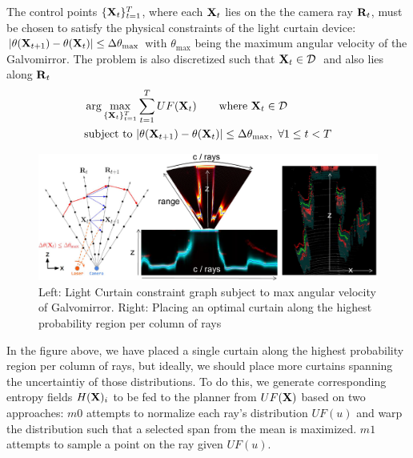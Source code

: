 The control points $\{\mathbf{X}_t\}_{t=1}^T$, where each $\mathbf{X}_t$ lies on the the camera ray $\mathbf{R}_t$, must be chosen to satisfy the physical constraints of the light curtain device: $|\theta(\mathbf{X}_{t+1}) - \theta(\mathbf{X}_t)| \leq \Delta \theta_\text{max}$ with $\theta_\text{max}$ being the maximum angular velocity of the Galvomirror. The problem is also discretized such that $\X_{t} \in \D\ $ and also lies along $\mathbf{R}_t$
\begin{align}
    &\arg \max_{\{\mathbf{X}_t\}_{t=1}^T} \sum_{t=1}^T UF(\mathbf{X}_t) \qquad \text{where}\ \mathbf{X}_t \in \mathcal{D}\ \nonumber\\
    &\text{subject to}\ |\theta(\mathbf{X}_{t+1}) - \theta(\mathbf{X}_t)| \leq \Delta \theta_\text{max},\ \forall 1 \leq t < T
    \label{eq:constraint}
\end{align}

\begin{figure}[h]
   \centering
   \begin{minipage}{0.5\textwidth}
       \centering
       \includegraphics[width=1.0\textwidth]{figures/planner.pdf}
   \end{minipage}\hfill
   \centering
   \caption{Left: Light Curtain constraint graph subject to max angular velocity of Galvomirror. Right: Placing an optimal curtain along the highest probability region per column of rays}
\end{figure}

In the figure above, we have placed a single curtain along the highest probability region per column of rays, but ideally, we should place more curtains spanning the uncertaintiy of those distributions. To do this, we generate corresponding entropy fields $H(\mathbf{X})_{i}$ to be fed to the planner from $UF(\mathbf{X})$ based on two approaches: $m0$ attempts to normalize each ray's distribution $UF(u)$ and warp the distribution such that a selected span from the mean is maximized. $m1$ attempts to sample a point on the ray given $UF(u)$. 

